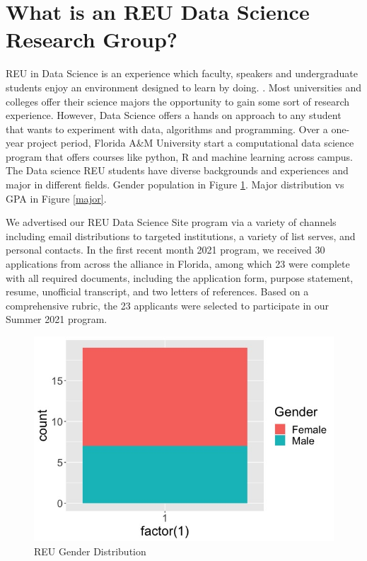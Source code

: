 \documentclass[10pt, a4paper, twocolumn]{article} %
\begin{document}

\section{What is an REU Data Science Research Group? }

REU in Data Science is an experience which faculty, speakers and undergraduate students enjoy an environment designed to learn by doing.  \citep{Reference1}. Most universities and colleges offer their science majors the opportunity to gain some sort of research experience\citep{Reference1,Reference2}. However, Data Science offers a hands on approach to any student that wants to experiment with data, algorithms and programming. Over a one-year project period, Florida A\&M University start a computational data science program that offers courses like python, R and machine learning across campus.  The Data science REU students have diverse backgrounds and experiences and major in different fields. Gender population in Figure \ref{gender}. Major distribution vs GPA in Figure \ref{major}.

We advertised our REU Data Science Site program via a variety of channels including email distributions to targeted institutions, a variety of list serves, and personal contacts. In the first recent month 2021 program, we received 30 applications from across the alliance in Florida, among which 23 were complete with all required documents, including the application form, purpose statement, resume, unofficial transcript, and two letters of references. Based on a comprehensive rubric, the 23 applicants were selected to participate in our Summer 2021 program.

\begin{figure}
	\includegraphics[width=\linewidth]{gender.jpeg} %
	\caption{REU Gender Distribution} %
	\label{gender} %
\end{figure}
\end{document}
